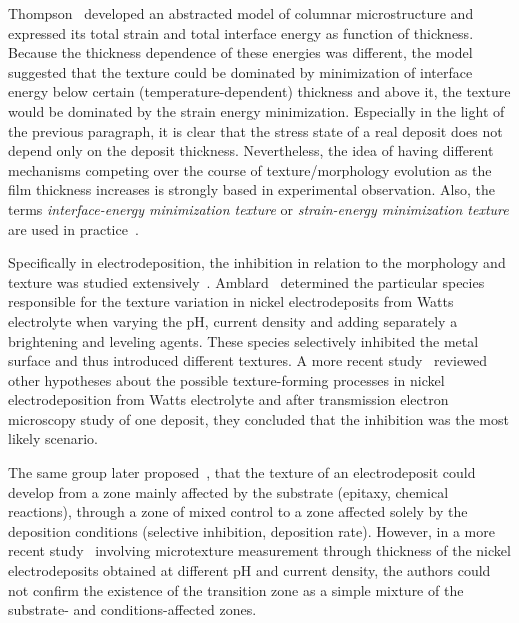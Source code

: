 Thompson~\cite{Thompson1993} developed an abstracted model of columnar microstructure and expressed its total strain and total interface energy as function of thickness. Because the thickness dependence of these energies was different, the model suggested that the texture could be dominated by minimization of interface energy below certain (temperature-dependent) thickness and above it, the texture would be dominated by the strain energy minimization. Especially in the light of the previous paragraph, it is clear that the stress state of a real deposit does not depend only on the deposit thickness. Nevertheless, the idea of having different mechanisms competing over the course of texture/morphology evolution as the film thickness increases is strongly based in experimental observation. Also, the terms \textit{interface-energy minimization texture} or \textit{strain-energy minimization texture} are used in practice~\cite{Alimadadi2016}.

Specifically in electrodeposition, the inhibition in relation to the morphology and texture was studied extensively~\cite{Winand1992}. Amblard~\cite{Amblard1979} determined the particular species responsible for the texture variation in nickel electrodeposits from Watts electrolyte when varying the pH, current density and adding separately a brightening and leveling agents. These species selectively inhibited the metal surface and thus introduced different textures. A more recent study~\cite{BergenstofNielsen1997} reviewed other hypotheses about the possible texture-forming processes in nickel electrodeposition from Watts electrolyte and after transmission electron microscopy study of one deposit, they concluded that the inhibition was the most likely scenario. 

The same group later proposed~\cite{Rasmussen2001}, that the texture of an electrodeposit could develop from a zone mainly affected by the substrate (epitaxy, chemical reactions), through a zone of mixed control to a zone affected solely by the deposition conditions (selective inhibition, deposition rate). However, in a more recent study~\cite{Alimadadi2016} involving microtexture measurement through thickness of the nickel electrodeposits obtained at different pH and current density, the authors could not confirm the existence of the transition zone as a simple mixture of the substrate- and conditions-affected zones. 


%



